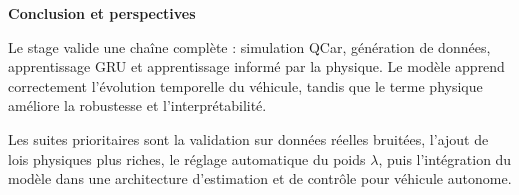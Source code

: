 \documentclass[10pt,a4paper]{article}
\newcommand{\sectiontitle}[1]{%
  \vspace{2.5mm}
  {\large\bfseries\color{accent} #1}\par
  \vspace{1mm}
}
\begin{document}
\vspace{2mm}

\sectiontitle{Conclusion et perspectives}
Le stage valide une chaîne complète : simulation QCar, génération de données, apprentissage GRU et apprentissage informé par la physique. Le modèle apprend correctement l'évolution temporelle du véhicule, tandis que le terme physique améliore la robustesse et l'interprétabilité.

Les suites prioritaires sont la validation sur données réelles bruitées, l'ajout de lois physiques plus riches, le réglage automatique du poids \(\lambda\), puis l'intégration du modèle dans une architecture d'estimation et de contrôle pour véhicule autonome.

\vspace{2mm}
\begin{center}
\end{center}
\end{document}
